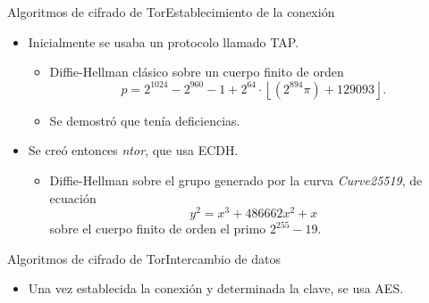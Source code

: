 \documentclass[spanish]{beamer}
\begin{document}
\begin{frame}{Algoritmos de cifrado de Tor}{Establecimiento de la conexión}

  \begin{itemize}
    \item Inicialmente se usaba un protocolo llamado TAP. \begin{itemize}
      \item Diffie-Hellman clásico sobre un cuerpo finito de orden \[
        p = 2^{1024} - 2^{960} - 1 + 2^{64} \cdot \left\lfloor (2^{894} \pi) + 129093 \right\rfloor.
      \]
      \item Se demostró que tenía deficiencias.
    \end{itemize}
    \item Se creó entonces \textit{ntor}, que usa ECDH. \begin{itemize}
      \item Diffie-Hellman sobre el grupo generado por la curva \textit{Curve25519}, de ecuación \[y^{2}=x^{3}+486662x^{2}+x\] sobre el cuerpo finito de orden el primo \(2^{255}-19\).
    \end{itemize}
  \end{itemize}

\end{frame}

\begin{frame}{Algoritmos de cifrado de Tor}{Intercambio de datos}

  \begin{itemize}
    \item Una vez establecida la conexión y determinada la clave, se usa AES.
  \end{itemize}

\end{frame}
\end{document}
